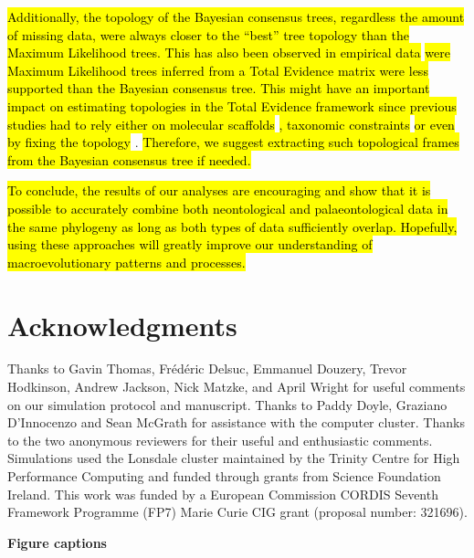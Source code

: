 \documentclass[12pt,letterpaper]{article}
\begin{document}
\hl{Additionally, the topology of the Bayesian consensus trees, regardless the amount of missing data, were always closer to the ``best'' tree topology than the Maximum Likelihood trees.
This has also been observed in empirical data} \cite[\hl{e.g.}][]{Arcila2015131}\hl{ were Maximum Likelihood trees inferred from a Total Evidence matrix were less supported than the Bayesian consensus tree.
This might have an important impact on estimating topologies in the Total Evidence framework since previous studies had to rely either on molecular scaffolds }\citep[\hl{e.g.}][]{slaterphylogenetic2013}\hl{, taxonomic constraints }\citep[\hl{e.g.}][]{slaterphylogenetic2013,beckancient2014}\hl{ or even by fixing the topology }\cite[\hl{e.g.}][]{ronquista2012}.
\hl{Therefore, we suggest extracting such topological frames from the Bayesian consensus tree if needed.}

\hl{To conclude, the results of our analyses are encouraging and show that it is possible to accurately combine both neontological and palaeontological data in the same phylogeny as long as both types of data sufficiently overlap.
Hopefully, using these approaches will greatly improve our understanding of macroevolutionary patterns and processes.}


\section{Acknowledgments}
Thanks to Gavin Thomas, Fr\'{e}d\'{e}ric Delsuc, Emmanuel Douzery, Trevor Hodkinson, Andrew Jackson, Nick Matzke, and April Wright for useful comments on our simulation protocol and manuscript. Thanks to Paddy Doyle, Graziano D'Innocenzo and Sean McGrath for assistance with the computer cluster. Thanks to the two anonymous reviewers for their useful and enthusiastic %
comments. Simulations used the Lonsdale cluster maintained by the Trinity Centre for High Performance Computing and funded through grants from Science Foundation Ireland. This work was funded by a European Commission CORDIS Seventh Framework Programme (FP7) Marie Curie CIG grant (proposal number: 321696).

\nolinenumbers




\newpage
\noindent
\textbf{Figure captions}\\
\bigskip
\end{document}
